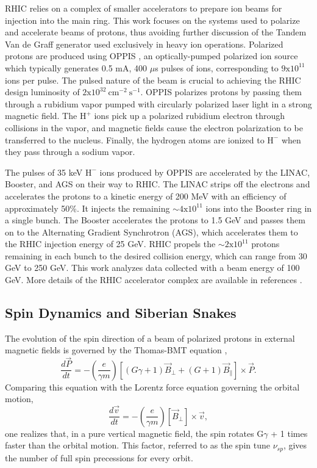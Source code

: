 RHIC relies on a complex of smaller accelerators to prepare ion beams for
injection into the main ring. This work focuses on the systems used to
polarize and accelerate beams of protons, thus avoiding further discussion of
the Tandem Van de Graff generator used exclusively in heavy ion operations.
Polarized protons are produced using OPPIS \cite{Zelenski:2002gb,
Zelenski:2008zza}, an optically-pumped polarized ion source which typically
generates 0.5 mA, 400 $\mu$s pulses of ions, corresponding to
$\mathrm{9x10^{11}}$ ions per pulse. The pulsed nature of the beam is crucial
to achieving the RHIC design luminosity of
$\mathrm{2x10^{32}~cm^{-2}~s^{-1}}$. OPPIS polarizes protons by passing them
through a rubidium vapor pumped with circularly polarized laser light in a
strong magnetic field. The $\mathrm{H^+}$ ions pick up a polarized rubidium
electron through collisions in the vapor, and magnetic fields cause the
electron polarization to be transferred to the nucleus. Finally, the hydrogen
atoms are ionized to $\mathrm{H^-}$ when they pass through a sodium vapor.

The pulses of 35 keV $\mathrm{H^-}$ ions produced by OPPIS are accelerated by
the LINAC, Booster, and AGS on their way to RHIC. The LINAC strips off the
electrons and accelerates the protons to a kinetic energy of 200 MeV with an
efficiency of approximately 50\%. It injects the remaining $\sim
\mathrm{4x10^{11}}$ ions into the Booster ring in a single bunch. The Booster
accelerates the protons to 1.5 GeV and passes them on to the Alternating
Gradient Synchrotron (AGS), which accelerates them to the RHIC injection
energy of 25 GeV. RHIC propels the $\sim \mathrm{2x10^{11}}$ protons remaining
in each bunch to the desired collision energy, which can range from 30 GeV to
250 GeV. This work analyzes data collected with a beam energy of 100 GeV. More
details of the RHIC accelerator complex are available in references
\cite{Harrison:2003sb, Hahn:2003sc, Alekseev:2003sk}.

\subsection{Spin Dynamics and Siberian Snakes}

The evolution of the spin direction of a beam of polarized protons in external
magnetic fields is governed by the Thomas-BMT equation \cite{Thomas:1927yu,
Bargmann:1959gz},
%
\begin{equation}
  \frac{d\vec{P}}{dt} = -\left(\frac{e}{\gamma m}\right)[(G\gamma + 1) \vec{B}_{\perp} + (G + 1) \vec{B}_{\parallel}] \times \vec{P}.
\end{equation}
%
Comparing this equation with the Lorentz force equation governing the orbital
motion,
%
\begin{equation}
  \frac{d\vec{v}}{dt} = -\left(\frac{e}{\gamma m}\right)[\vec{B}_{\perp}] \times \vec{v},
\end{equation}
%
one realizes that, in a pure vertical magnetic field, the spin rotates
G$\gamma$ + 1 times faster than the orbital motion. This factor, referred to
as the spin tune $\nu_{sp}$, gives the number of full spin precessions for
every orbit.


